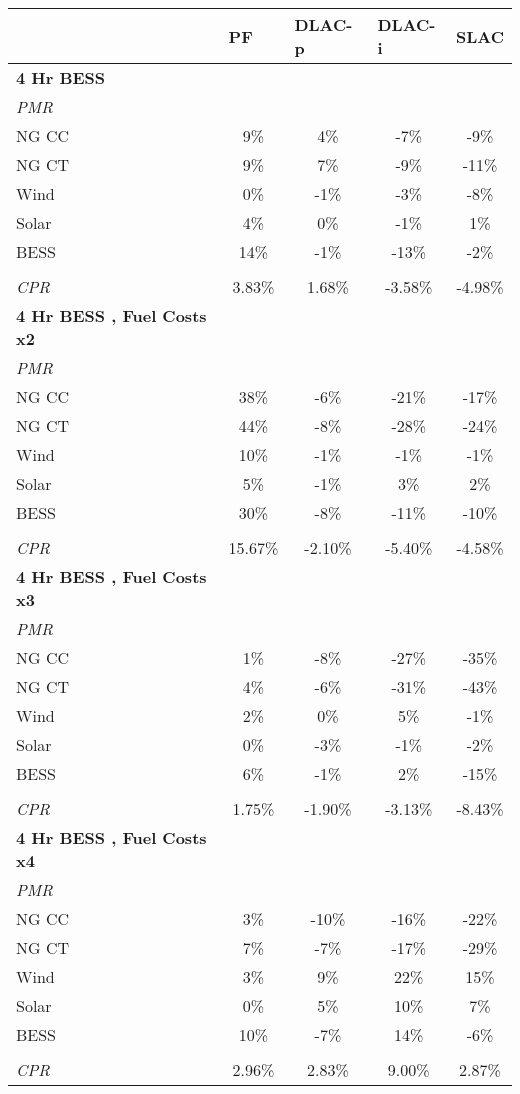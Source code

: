 \begin{table}[]
\centering
\begin{tabular}{lcccc}
\hline
& \multicolumn{1}{l}{\textbf{PF}} & \multicolumn{1}{l}{\textbf{DLAC-p}} & \multicolumn{1}{l}{\textbf{DLAC-i}} & \multicolumn{1}{l}{\textbf{SLAC}} \\ \hline
\textbf{4 Hr BESS} &  &  &  & \\
 \quad \textit{PMR}  &  &  &  & \\
\qquad NG CC & 9\% & 4\% & -7\% & -9\% \\
\qquad NG CT & 9\% & 7\% & -9\% & -11\% \\
\qquad Wind & 0\% & -1\% & -3\% & -8\% \\
\qquad Solar & 4\% & 0\% & -1\% & 1\% \\
\qquad BESS & 14\% & -1\% & -13\% & -2\% \\
&  &  &  & \\
\quad \textit{CPR} & 3.83\% & 1.68\% & -3.58\% & -4.98\% \\\hline
\textbf{4 Hr BESS , Fuel Costs x2} &  &  &  & \\
 \quad \textit{PMR}  &  &  &  & \\
\qquad NG CC & 38\% & -6\% & -21\% & -17\% \\
\qquad NG CT & 44\% & -8\% & -28\% & -24\% \\
\qquad Wind & 10\% & -1\% & -1\% & -1\% \\
\qquad Solar & 5\% & -1\% & 3\% & 2\% \\
\qquad BESS & 30\% & -8\% & -11\% & -10\% \\
&  &  &  & \\
\quad \textit{CPR} & 15.67\% & -2.10\% & -5.40\% & -4.58\% \\\hline
\textbf{4 Hr BESS , Fuel Costs x3} &  &  &  & \\
 \quad \textit{PMR}  &  &  &  & \\
\qquad NG CC & 1\% & -8\% & -27\% & -35\% \\
\qquad NG CT & 4\% & -6\% & -31\% & -43\% \\
\qquad Wind & 2\% & 0\% & 5\% & -1\% \\
\qquad Solar & 0\% & -3\% & -1\% & -2\% \\
\qquad BESS & 6\% & -1\% & 2\% & -15\% \\
&  &  &  & \\
\quad \textit{CPR} & 1.75\% & -1.90\% & -3.13\% & -8.43\% \\\hline
\textbf{4 Hr BESS , Fuel Costs x4} &  &  &  & \\
 \quad \textit{PMR}  &  &  &  & \\
\qquad NG CC & 3\% & -10\% & -16\% & -22\% \\
\qquad NG CT & 7\% & -7\% & -17\% & -29\% \\
\qquad Wind & 3\% & 9\% & 22\% & 15\% \\
\qquad Solar & 0\% & 5\% & 10\% & 7\% \\
\qquad BESS & 10\% & -7\% & 14\% & -6\% \\
&  &  &  & \\
\quad \textit{CPR} & 2.96\% & 2.83\% & 9.00\% & 2.87\% \\\hline
\end{tabular}
\end{table}
